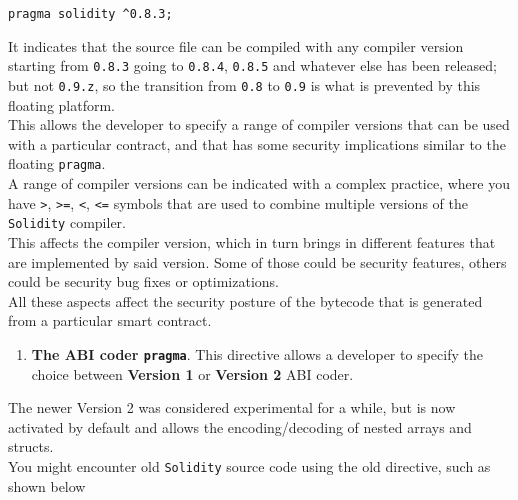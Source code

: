 \begin{enumerate}
  \begin{lstlisting}[language=Solidity,numbers=none]
  pragma solidity ^0.8.3;
  \end{lstlisting}

  \hfill\break
  It indicates that the source file can be compiled with any compiler
  version starting from \texttt{0.8.3} going to \texttt{0.8.4},
  \texttt{0.8.5} and whatever else has been released; but not
  \texttt{0.9.z}, so the transition from \texttt{0.8} to \texttt{0.9} is
  what is prevented by this floating platform.\\

  This allows the developer to specify a range of compiler versions that
  can be used with a particular contract, and that has some security
  implications similar to the floating \texttt{pragma}.\\

  A range of compiler versions can be indicated with a complex practice,
  where you have \texttt{\textgreater{}}, \texttt{\textgreater{}=},
  \texttt{\textless{}}, \texttt{\textless{}=} symbols that are used to
  combine multiple versions of the \texttt{Solidity} compiler.\\

  This affects the compiler version, which in turn brings in different
  features that are implemented by said version. Some of those could be
  security features, others could be security bug fixes or
  optimizations.\\

  All these aspects affect the security posture of the bytecode that is
  generated from a particular smart contract.\\

  \begin{enumerate}
  \def\labelenumii{\alph{enumii}.}
  \setcounter{enumii}{1}
  \tightlist
  \item
    \textbf{The ABI coder \texttt{pragma}}. This directive allows a
    developer to specify the choice between \textbf{Version 1} or
    \textbf{Version 2} ABI coder.\\
  \end{enumerate}

  The newer Version 2 was considered experimental for a while, but is
  now activated by default and allows the encoding/decoding of nested
  arrays and structs.\\

  You might encounter old \texttt{Solidity} source code using the old
  directive, such as shown below\\


\end{enumerate}
